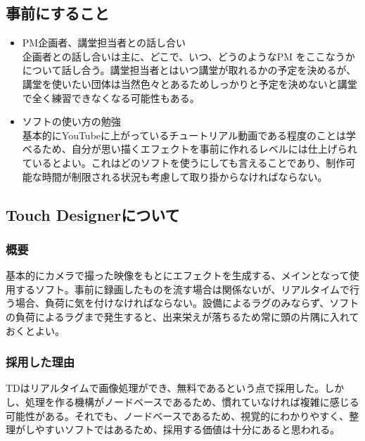 \documentclass[dvipdfmx,jb5]{jreport}
\begin{document}
\subsection{事前にすること}
\begin{itemize}
      \item PM企画者、講堂担当者との話し合い\\
            企画者との話し合いは主に、どこで、いつ、どうのようなPM をここなうかについて話し合う。講堂担当者とはいつ講堂が取れるかの予定を決めるが、講堂を使いたい団体は当然色々とあるためしっかりと予定を決めないと講堂で全く練習できなくなる可能性もある。
      \item ソフトの使い方の勉強\\
            基本的にYouTubeに上がっているチュートリアル動画である程度のことは学べるため、自分が思い描くエフェクトを事前に作れるレベルには仕上げられているとよい。これはどのソフトを使うにしても言えることであり、制作可能な時間が制限される状況も考慮して取り掛からなければならない。
\end{itemize}

\subsection{Touch Designerについて}
\subsubsection{概要}
基本的にカメラで撮った映像をもとにエフェクトを生成する、メインとなって使用するソフト。事前に録画したものを流す場合は関係ないが、リアルタイムで行う場合、負荷に気を付けなければならない。設備によるラグのみならず、ソフトの負荷によるラグまで発生すると、出来栄えが落ちるため常に頭の片隅に入れておくとよい。

\subsubsection{採用した理由}
TDはリアルタイムで画像処理ができ、無料であるという点で採用した。しかし、処理を作る機構がノードベースであるため、慣れていなければ複雑に感じる可能性がある。それでも、ノードベースであるため、視覚的にわかりやすく、整理がしやすいソフトではあるため、採用する価値は十分にあると思われる。
\end{document}
